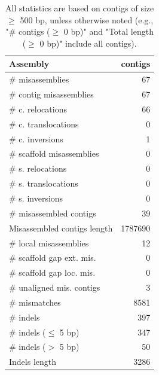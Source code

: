 \documentclass[12pt,a4paper]{article}
\begin{document}
\begin{table}[ht]
\begin{center}
\caption{All statistics are based on contigs of size $\geq$ 500 bp, unless otherwise noted (e.g., "\# contigs ($\geq$ 0 bp)" and "Total length ($\geq$ 0 bp)" include all contigs).}
\begin{tabular}{|l*{1}{|r}|}
\hline
Assembly & contigs \\ \hline
\# misassemblies & 67 \\ \hline
\hspace{2mm}\# contig misassemblies & 67 \\ \hline
\hspace{5mm}\# c. relocations & 66 \\ \hline
\hspace{5mm}\# c. translocations & 0 \\ \hline
\hspace{5mm}\# c. inversions & 1 \\ \hline
\hspace{2mm}\# scaffold misassemblies & 0 \\ \hline
\hspace{5mm}\# s. relocations & 0 \\ \hline
\hspace{5mm}\# s. translocations & 0 \\ \hline
\hspace{5mm}\# s. inversions & 0 \\ \hline
\# misassembled contigs & 39 \\ \hline
Misassembled contigs length & 1787690 \\ \hline
\# local misassemblies & 12 \\ \hline
\# scaffold gap ext. mis. & 0 \\ \hline
\# scaffold gap loc. mis. & 0 \\ \hline
\# unaligned mis. contigs & 3 \\ \hline
\# mismatches & 8581 \\ \hline
\# indels & 397 \\ \hline
\hspace{5mm}\# indels ($\leq$ 5 bp) & 347 \\ \hline
\hspace{5mm}\# indels ($>$ 5 bp) & 50 \\ \hline
Indels length & 3286 \\ \hline
\end{tabular}
\end{center}
\end{table}
\end{document}
